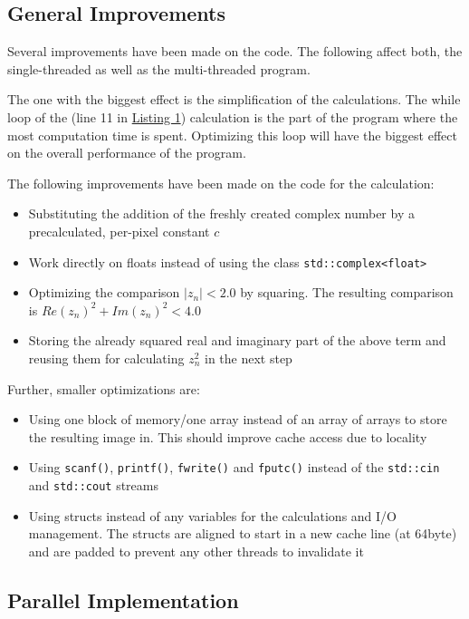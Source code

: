 \subsection{General Improvements}
\label{ssec:Improvements}

Several improvements have been made on the code. The following affect both, the single-threaded as well as the multi-threaded program.

The one with the biggest effect is the simplification of the calculations. The while loop of the \ms{} (line 11 in \hyperref[lst:pseudo-code-original]{Listing 1}) calculation is the part of the program where the most computation time is spent. Optimizing this loop will have the biggest effect on the overall performance of the program.

The following improvements have been made on the code for the \ms{} calculation:
\begin{itemize}
    \item Substituting the addition of the freshly created complex number by a precalculated, per-pixel constant $c$
    \item Work directly on floats instead of using the class \verb|std::complex<float>|
    \item Optimizing the comparison $|z_n| < 2.0$ by squaring. The resulting comparison is $Re(z_n)^2 + Im(z_n)^2 < 4.0$
    \item Storing the already squared real and imaginary part of the above term and reusing them for calculating $z_n^2$ in the next step
\end{itemize}

Further, smaller optimizations are:
\begin{itemize}
    \item Using one block of memory/one array instead of an array of arrays to store the resulting image in. This should improve cache access due to locality
    \item Using \verb$scanf()$, \verb$printf()$, \verb$fwrite()$ and \verb$fputc()$ instead of the \verb$std::cin$ and \verb$std::cout$ streams
    \item Using structs instead of any variables for the calculations and I/O management. The structs are aligned to start in a new cache line (at 64byte) and are padded to prevent any other threads to invalidate it
\end{itemize}


\subsection{Parallel Implementation}
\label{ssec:Improvements}

